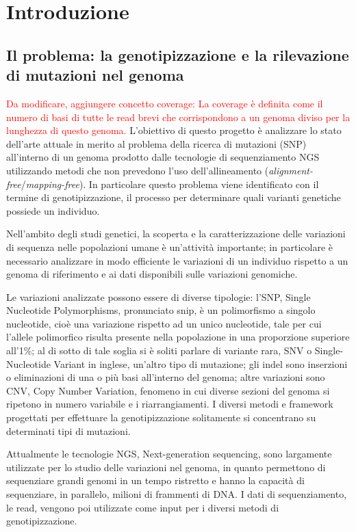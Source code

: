 \documentclass[../main.tex]{subfiles}
\begin{document}
\section{Introduzione} 

\subsection{Il problema: la genotipizzazione e la rilevazione di mutazioni nel genoma}

\textcolor{red}{Da modificare, aggiungere concetto coverage: La coverage è definita come il numero di basi di tutte le read brevi che corrispondono a un genoma diviso per la lunghezza di questo genoma.} L'obiettivo di questo progetto è analizzare lo stato dell'arte attuale in merito al problema della ricerca di mutazioni (SNP) all'interno di un genoma prodotto dalle tecnologie di sequenziamento NGS utilizzando metodi che non prevedono l'uso dell'allineamento (\textit{alignment-free}/\textit{mapping-free}). In particolare questo problema viene identificato con il termine di genotipizzazione, il processo per determinare quali varianti genetiche possiede un individuo.

Nell'ambito degli studi genetici, la scoperta e la caratterizzazione delle variazioni di sequenza nelle popolazioni umane è un'attività importante; in particolare è necessario analizzare in modo efficiente le variazioni di un individuo rispetto a un genoma di riferimento e ai dati disponibili sulle variazioni genomiche. 

Le variazioni analizzate possono essere di diverse tipologie: l'SNP, Single Nucleotide Polymorphisms, pronunciato snip, è un polimorfismo a singolo nucleotide, cioè una variazione rispetto ad un unico nucleotide, tale per cui l'allele polimorfico risulta presente nella popolazione in una proporzione superiore all'1\%; al di sotto di tale soglia si è soliti parlare di variante rara, SNV o Single-Nucleotide Variant in inglese, un'altro tipo di mutazione; gli indel sono inserzioni o eliminazioni di una o più basi all'interno del genoma; altre variazioni sono CNV, Copy Number Variation, fenomeno in cui diverse sezioni del genoma si ripetono in numero variabile e i riarrangiamenti. I diversi metodi e framework progettati per effettuare la genotipizzazione solitamente si concentrano su determinati tipi di mutazioni.


Attualmente le tecnologie NGS, Next-generation sequencing, sono largamente utilizzate per lo studio delle variazioni nel genoma, in quanto permettono di sequenziare grandi genomi in un tempo ristretto e hanno la capacità di sequenziare, in parallelo, milioni di frammenti di DNA. I dati di sequenziamento, le read, vengono poi utilizzate come input per i diversi metodi di genotipizzazione.
\end{document}
